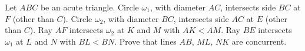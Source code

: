 Let $ABC$ be an acute triangle.  Circle $\omega_1$, with diameter $AC$, intersects side $BC$ at $F$ (other than $C$).  Circle $\omega_2$, with diameter $BC$, intersects side $AC$ at $E$ (other than $C$).  Ray $AF$ intersects $\omega_2$ at $K$ and $M$ with $AK < AM$.  Ray $BE$ intersects $\omega_1$ at $L$ and $N$ with $BL < BN$.  Prove that lines $AB$, $ML$, $NK$ are concurrent.
